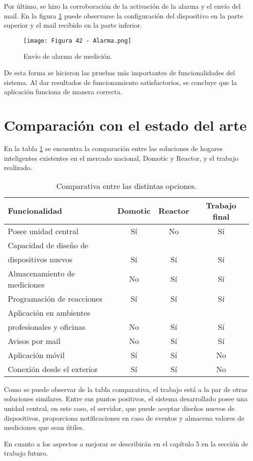 Por último, se hizo la corroboración de la activación de la alarma y el envío del mail. En la figura \ref{fig:42} puede observarse la configuración del dispositivo en la parte superior y el mail recibido en la parte inferior.

\begin{figure}[h]
\centering
\texttt{[image: Figura 42 - Alarma.png]}
\caption[Envío alarma]{Envío de alarma de medición.}
\label{fig:42}
\end{figure}

De esta forma se hicieron las pruebas más importantes de funcionalidades del sistema. Al dar resultados de funcionamiento satisfactorios, se concluye que la aplicación funciona de manera correcta.

\section{Comparación con el estado del arte}

En la tabla \ref{tab:estadoarte} se encuentra la comparación entre las soluciones de hogares inteligentes existentes en el mercado nacional, Domotic y Reactor, y el trabajo realizado. 

\newpage
\begin{table}[h]
\centering
\caption[Estado arte mercado nacional]{Comparativa entre las distintas opciones.}
\begin{tabular}{l c c c}
\toprule
\textbf{Funcionalidad} & \textbf{Domotic} & \textbf{Reactor} & \textbf{Trabajo final}\\
\midrule
Posee unidad central			& Sí		& No		& Sí\\
Capacidad de diseño de		&		&		&\\
dispositivos nuevos			& Sí		& Sí		& Sí\\
Almacenamiento de mediciones	& No		& Sí		& Sí\\
Programación de reacciones	& Sí		& Sí		& Sí\\
Aplicación en ambientes		&		&		&\\
profesionales y oficinas		& No		& Sí		& Sí\\
Avisos por mail				& No		& Sí		& Sí\\
Aplicación móvil				& Sí		& Sí		& No\\
Conexión	 desde el exterior	& Sí		& Sí		& No\\
\bottomrule
\hline
\end{tabular}
\label{tab:estadoarte}
\end{table}

Como se puede observar de la tabla comparativa, el trabajo está a la par de otras soluciones similares. Entre sus puntos positivos, el sistema desarrollado posee una unidad central, en este caso, el servidor, que puede aceptar diseños nuevos de dispositivos, proporciona notificaciones en caso de eventos y almacena valores de mediciones que sean útiles.

En cuanto a los aspectos a mejorar se describirán en el capítulo 5 en la sección de trabajo futuro.